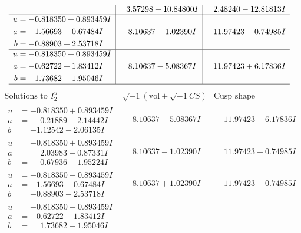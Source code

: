 \documentclass[1p]{elsarticle_modified}
\theoremstyle{definition}
\newcommand{\I}{\sqrt{-1}}
\begin{document}
$$\begin{array}{c|c|c}
 & \phantom{-}3.57298 + 10.84800 I & \phantom{-}2.48240 - 12.81813 I \\ \hline\begin{aligned}
u &= -0.818350 + 0.893459 I \\
a &= -1.56693 + 0.67484 I \\
b &= -0.88903 + 2.53718 I\end{aligned}
 & \phantom{-}8.10637 - 1.02390 I & \phantom{-}11.97423 - 0.74985 I \\ \hline\begin{aligned}
u &= -0.818350 + 0.893459 I \\
a &= -0.62722 + 1.83412 I \\
b &= \phantom{-}1.73682 + 1.95046 I\end{aligned}
 & \phantom{-}8.10637 - 5.08367 I & \phantom{-}11.97423 + 6.17836 I\\
 \hline 
 \end{array}$$\newpage$$\begin{array}{c|c|c}  
\text{Solutions to }I^u_{2}& \I (\text{vol} + \sqrt{-1}CS) & \text{Cusp shape}\\
 \hline 
\begin{aligned}
u &= -0.818350 + 0.893459 I \\
a &= \phantom{-}0.21889 - 2.14442 I \\
b &= -1.12542 - 2.06135 I\end{aligned}
 & \phantom{-}8.10637 - 5.08367 I & \phantom{-}11.97423 + 6.17836 I \\ \hline\begin{aligned}
u &= -0.818350 + 0.893459 I \\
a &= \phantom{-}2.03983 - 0.87331 I \\
b &= \phantom{-}0.67936 - 1.95224 I\end{aligned}
 & \phantom{-}8.10637 - 1.02390 I & \phantom{-}11.97423 - 0.74985 I \\ \hline\begin{aligned}
u &= -0.818350 - 0.893459 I \\
a &= -1.56693 - 0.67484 I \\
b &= -0.88903 - 2.53718 I\end{aligned}
 & \phantom{-}8.10637 + 1.02390 I & \phantom{-}11.97423 + 0.74985 I \\ \hline\begin{aligned}
u &= -0.818350 - 0.893459 I \\
a &= -0.62722 - 1.83412 I \\
b &= \phantom{-}1.73682 - 1.95046 I\end{aligned}

\end{array}$$
\end{document}
